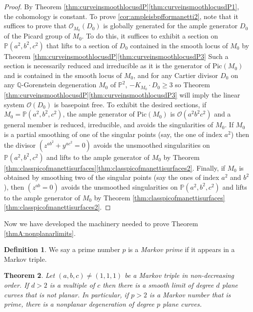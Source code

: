 \documentclass[11pt]{article}
\theoremstyle{plain}
\newtheorem{theorem}{Theorem}[section]
\theoremstyle{definition}
\newtheorem{definition}[theorem]{Definition}
\newcommand\PP{{\mathbb{P}}}
\newcommand\QQ{{\mathbb Q}}
\newcommand\Oc{{\mathcal O}}
\newcommand\Pic{{\mathrm{Pic}}}
\newcommand\Pabc{{\PP(a^2,b^2,c^2)}}
\begin{document}
\begin{proof}

By Theorem \ref{thm:curveinsmoothlocusdP}\eqref{thm:curveinsmoothlocusdP1}, the cohomology is constant. To prove \eqref{cor:ampleisbpfformanetti2}, note that it suffices to prove that $\Oc_{M_0}(D_0)$ is globally generated for the ample generator $D_0$ of the Picard group of $M_0$. To do this, it suffices to exhibit a section on $\Pabc$ that lifts to a section of $D_0$ contained in the smooth locus of $M_0$ by Theorem \ref{thm:curveinsmoothlocusdP}\eqref{thm:curveinsmoothlocusdP3} Such a section is necessarily reduced and irreducible as it is the generator of $\Pic(M_0)$ and is contained in the smooth locus of $M_0$, and for any Cartier divisor $D_0$ on any $\QQ$-Gorenstein degeneration $M_0$ of $\PP^2$, $-K_{M_0} \cdot D_0 \ge 3$ so Theorem \ref{thm:curveinsmoothlocusdP}\eqref{thm:curveinsmoothlocusdP3} will imply the linear system $\Oc(D_0)$ is basepoint free. To exhibit the desired sections, if $M_0 = \Pabc$, the ample generator of $\Pic(M_0)$ is $\Oc(a^2b^2c^2)$ and a general member is reduced, irreducible, and avoids the singularities of $M_0$. If $M_0$ is a partial smoothing of one of the singular points (say, the one of index $a^2$) then the divisor \hbox{$(z^{ab^2}+y^{ac^2}=0)$} avoids the unsmoothed singularities on $\Pabc$ and lifts to the ample generator of $M_0$ by Theorem \ref{thm:classpicofmanettisurfaces}\eqref{thm:classpicofmanettisurfaces2}. Finally, if $M_0$ is obtained by smoothing two of the singular points (say the ones of index $a^2$ and $b^2$), then $(z^{ab}=0)$ avoids the unsmoothed singularities on $\Pabc$ and lifts to the ample generator of $M_0$ by Theorem \ref{thm:classpicofmanettisurfaces}\eqref{thm:classpicofmanettisurfaces2}.
\end{proof}

Now we have developed the machinery needed to prove Theorem \ref{thmA:nonplanarlimits}.

\begin{definition}
We say a prime number $p$ is a \textit{Markov prime} if it appears in a Markov triple.
\end{definition}

\begin{theorem}\label{smoothlimits1}
Let $(a,b,c)\ne (1,1,1)$ be a Markov triple in non-decreasing order. If $d>2$ is a multiple of $c$ then there is a smooth limit of degree $d$ plane curves that is not planar. In particular, if $p>2$ is a Markov number that is prime, there is a nonplanar degeneration of degree $p$ plane curves.
\end{theorem}
\end{document}

